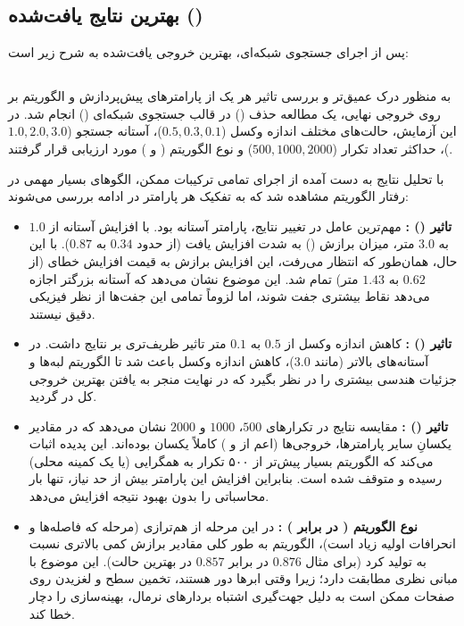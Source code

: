 \documentclass[12pt,a4paper]{article}
\begin{document}
\subsection{بهترین نتایج یافت‌شده ()}
پس از اجرای جستجوی شبکه‌ای، بهترین خروجی یافت‌شده به شرح زیر است:
\subsection{ }

به منظور درک عمیق‌تر و بررسی تاثیر هر یک از پارامترهای پیش‌پردازش و الگوریتم  بر روی خروجی نهایی، یک مطالعه حذف () در قالب جستجوی شبکه‌ای () انجام شد. در این آزمایش، حالت‌های مختلف اندازه وکسل ($0.5, 0.3, 0.1$)، آستانه جستجو ($1.0, 2.0, 3.0$)، حداکثر تعداد تکرار ($500, 1000, 2000$) و نوع الگوریتم ( و ) مورد ارزیابی قرار گرفتند. 

با تحلیل نتایج به دست آمده از اجرای تمامی ترکیبات ممکن، الگوهای بسیار مهمی در رفتار الگوریتم مشاهده شد که به تفکیک هر پارامتر در ادامه بررسی می‌شوند:

\begin{itemize}
	\item \textbf{تاثیر  () :} مهم‌ترین عامل در تغییر نتایج، پارامتر آستانه بود. با افزایش آستانه از $1.0$ به $3.0$ متر، میزان برازش () به شدت افزایش یافت (از حدود $0.34$ به $0.87$). با این حال، همان‌طور که انتظار می‌رفت، این افزایش برازش به قیمت افزایش خطای  (از $0.62$ به $1.43$ متر) تمام شد. این موضوع نشان می‌دهد که آستانه بزرگتر اجازه می‌دهد نقاط بیشتری جفت شوند، اما لزوماً تمامی این جفت‌ها از نظر فیزیکی دقیق نیستند.
	
	\item \textbf{تاثیر  () :} کاهش اندازه وکسل از $0.5$ به $0.1$ متر تاثیر ظریف‌تری بر نتایج داشت. در آستانه‌های بالاتر (مانند $3.0$)، کاهش اندازه وکسل باعث شد تا الگوریتم لبه‌ها و جزئیات هندسی بیشتری را در نظر بگیرد که در نهایت منجر به یافتن بهترین خروجی کل در  گردید.
	
	\item \textbf{تاثیر  () :} مقایسه نتایج در تکرارهای $500$، $1000$ و $2000$ نشان می‌دهد که در مقادیر یکسانِ سایر پارامترها، خروجی‌ها (اعم از  و ) کاملاً یکسان بوده‌اند. این پدیده اثبات می‌کند که الگوریتم بسیار پیش‌تر از ۵۰۰ تکرار به همگرایی (یا یک کمینه محلی) رسیده و متوقف شده است. بنابراین افزایش این پارامتر بیش از حد نیاز، تنها بار محاسباتی را بدون بهبود نتیجه افزایش می‌دهد.
	
	\item \textbf{نوع الگوریتم ( در برابر ) :} در این مرحله از هم‌ترازی (مرحله  که فاصله‌ها و انحرافات اولیه زیاد است)، الگوریتم  به طور کلی مقادیر برازش کمی بالاتری نسبت به  تولید کرد (برای مثال $0.876$ در برابر $0.857$ در بهترین حالت). این موضوع با مبانی نظری مطابقت دارد؛ زیرا وقتی ابرها دور هستند، تخمین سطح و لغزیدن روی صفحات ممکن است به دلیل جهت‌گیری اشتباه بردارهای نرمال، بهینه‌سازی را دچار خطا کند.
\end{itemize}
\end{document}
